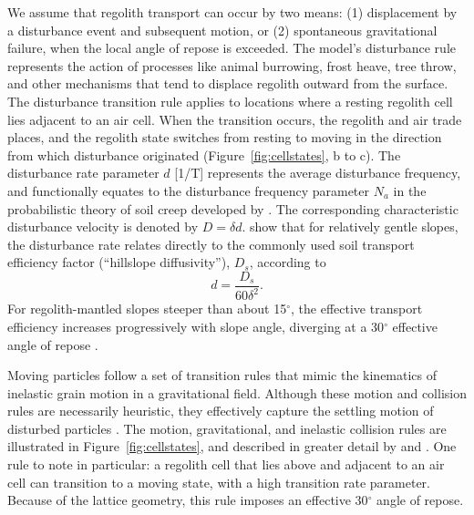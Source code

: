 We assume that regolith transport can occur by two means: (1) displacement by a disturbance event and subsequent motion, or (2) spontaneous gravitational failure, when the local angle of repose is exceeded. The model's disturbance rule represents the action of processes like animal burrowing, frost heave, tree throw, and other mechanisms that tend to displace regolith outward from the surface. The disturbance transition rule applies to locations where a resting regolith cell lies adjacent to an air cell. When the transition occurs, the regolith and air trade places, and the regolith state switches from resting to moving in the direction from which disturbance originated (Figure~\ref{fig:cellstates}, b to c). The disturbance rate parameter $d$ [1/T] represents the average disturbance frequency, and functionally equates to the disturbance frequency parameter $N_a$ in the probabilistic theory of soil creep developed by \citet{furbish2009statistical}. The corresponding characteristic disturbance velocity is denoted by $D=\delta d$.  \citet{tucker2018lattice} show that for relatively gentle slopes, the disturbance rate relates directly to the commonly used soil transport efficiency factor (``hillslope diffusivity''), $D_s$, according to
\begin{equation}
d = \frac{D_s}{60 \delta^2}.
\end{equation}
For regolith-mantled slopes steeper than about 15$^\circ$, the effective transport efficiency increases progressively with slope angle, diverging at a 30$^\circ$ effective angle of repose \citep[][their Figure 10]{tucker2018lattice}.

Moving particles follow a set of transition rules that mimic the kinematics of inelastic grain motion in a gravitational field. Although these motion and collision rules are necessarily heuristic, they effectively capture the settling motion of disturbed particles \citep{furbish2009statistical}. The motion, gravitational, and inelastic collision rules are illustrated in Figure~\ref{fig:cellstates}, and described in greater detail by \citet{tucker2016celllab} and \citet{tucker2018lattice}. One rule to note in particular: a regolith cell that lies above and adjacent to an air cell can transition to a moving state, with a high transition rate parameter. Because of the lattice geometry, this rule imposes an effective 30$^\circ$ angle of repose.

